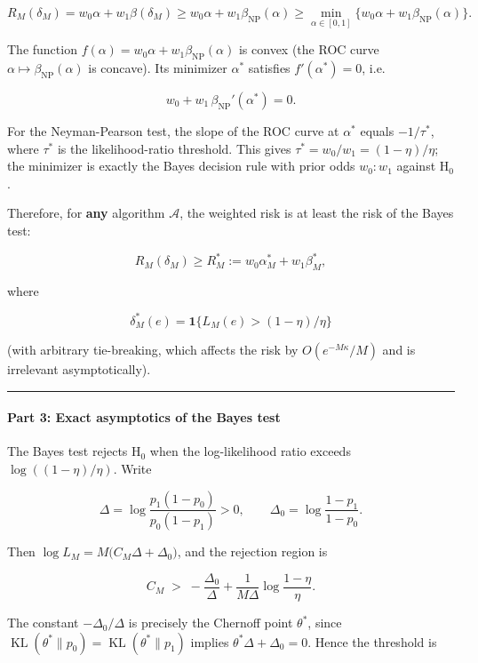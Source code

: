 \documentclass[12pt]{article}
\begin{document}
\[
R_M(\delta_M) = w_0\alpha + w_1\beta(\delta_M)
\ge w_0\alpha + w_1\beta_{\mathrm{NP}}(\alpha)
\ge \min_{\alpha\in[0,1]} \bigl\{w_0\alpha + w_1\beta_{\mathrm{NP}}(\alpha)\bigr\}.
\]

The function \(f(\alpha)=w_0\alpha+w_1\beta_{\mathrm{NP}}(\alpha)\) is
convex (the ROC curve \(\alpha\mapsto\beta_{\mathrm{NP}}(\alpha)\) is
concave). Its minimizer \(\alpha^*\) satisfies \(f'(\alpha^*)=0\), i.e.

\[
w_0 + w_1\,\beta_{\mathrm{NP}}'(\alpha^*) = 0.
\]

For the Neyman-Pearson test, the slope of the ROC curve at \(\alpha^*\)
equals \(-1/\tau^*\), where \(\tau^*\) is the likelihood-ratio
threshold. This gives \(\tau^* = w_0/w_1 = (1-\eta)/\eta\); the
minimizer is exactly the Bayes decision rule with prior odds \(w_0:w_1\)
against \(\mathrm{H}_0\).

Therefore, for \textbf{any} algorithm \(\mathcal{A}\), the weighted risk
is at least the risk of the Bayes test:

\[
R_M(\delta_M) \ge R_M^* := w_0\alpha_M^* + w_1\beta_M^*,
\]

where

\[
\delta_M^*(e) = \mathbf{1}\bigl\{L_M(e) > (1-\eta)/\eta\bigr\}
\]

(with arbitrary tie-breaking, which affects the risk by
\(O(e^{-M\kappa}/M)\) and is irrelevant asymptotically).

\begin{center}\rule{0.5\linewidth}{0.5pt}\end{center}

\paragraph{Part 3: Exact asymptotics of the Bayes
test}\label{part-3-exact-asymptotics-of-the-bayes-test}

The Bayes test rejects \(\mathrm{H}_0\) when the log-likelihood ratio
exceeds \(\log((1-\eta)/\eta)\). Write

\[
\Delta = \log\frac{p_1(1-p_0)}{p_0(1-p_1)} > 0,\qquad
\Delta_0 = \log\frac{1-p_1}{1-p_0}.
\]

Then \(\log L_M = M\bigl(C_M\Delta + \Delta_0\bigr)\), and the rejection
region is

\[
C_M \;>\; -\frac{\Delta_0}{\Delta} + \frac{1}{M\Delta}\log\frac{1-\eta}{\eta}.
\]

The constant \(-\Delta_0/\Delta\) is precisely the Chernoff point
\(\theta^*\), since
\(\operatorname{KL}(\theta^*\|p_0)=\operatorname{KL}(\theta^*\|p_1)\)
implies \(\theta^*\Delta + \Delta_0 = 0\). Hence the threshold is
\end{document}
